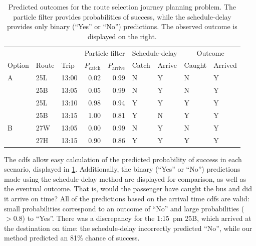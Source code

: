 \begin{knitrout}\small
{}\color{fgcolor}\begin{table}

\caption[Predicted outcomes for the route selection journey planning problem]{\label{tab:eta_journey_results}Predicted outcomes for the route selection journey planning problem. The particle filter provides probabilities of success, while the schedule-delay provides only binary (``Yes'' or ``No'') predictions. The observed outcome is displayed on the right.}
\centering
\fontsize{8}{10}\selectfont
\begin{tabular}[t]{lllrrllll}
\toprule
\multicolumn{1}{c}{} & \multicolumn{1}{c}{} & \multicolumn{1}{c}{} & \multicolumn{2}{c}{Particle filter} & \multicolumn{2}{c}{Schedule-delay} & \multicolumn{2}{c}{Outcome} \\
\cmidrule(l{3pt}r{3pt}){4-5} \cmidrule(l{3pt}r{3pt}){6-7} \cmidrule(l{3pt}r{3pt}){8-9}
Option & Route & Trip & $P_\text{catch}$ & $P_\text{arrive}$ & Catch & Arrive & Caught & Arrived\\
\midrule
A & 25L & 13:00 & 0.02 & 0.99 & N & Y & N & Y\\
 & 25B & 13:05 & 0.05 & 0.99 & N & Y & N & Y\\
 & 25L & 13:10 & 0.98 & 0.94 & Y & Y & Y & Y\\
 & 25B & 13:15 & 1.00 & 0.81 & Y & N & Y & Y\\
\midrule
B & 27W & 13:05 & 0.00 & 0.99 & N & Y & N & Y\\
 & 27H & 13:15 & 0.90 & 0.86 & Y & Y & Y & Y\\
\bottomrule
\end{tabular}
\end{table}


\end{knitrout}


The \glspl{cdf} allow easy calculation of the predicted probability of success in each scenario, displayed in \cref{tab:eta_journey_results}. Additionally, the binary (``Yes'' or ``No'') predictions made using the schedule-delay method are displayed for comparison, as well as the eventual outcome. That is, would the passenger have caught the bus and did it arrive on time? All of the predictions based on the \pf{} arrival time \glspl{cdf} are valid: small probabilities correspond to an outcome of ``No'' and large probabilities ($>0.8$) to ``Yes''. There was a discrepancy for the 1:15~pm 25B, which arrived at the destination on time: the schedule-delay incorrectly predicted ``No'', while our method predicted an 81\% chance of success.



